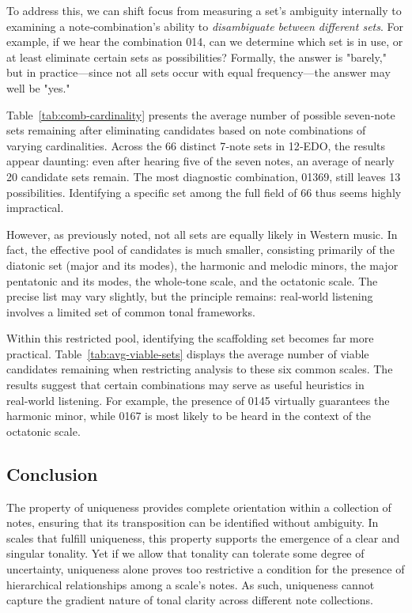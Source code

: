 \documentclass[10pt,twocolumn]{article}
\numberwithin{equation}{section} %
\begin{document}
    To address this, we can shift focus from measuring a set's ambiguity internally to examining a note‑combination's ability to \textit{disambiguate between different sets}.
    For example, if we hear the combination 014, can we determine which set is in use, or at least eliminate certain sets as possibilities?
    Formally, the answer is "barely," but in practice—since not all sets occur with equal frequency—the answer may well be "yes."

    Table~\ref{tab:comb-cardinality} presents the average number of possible seven‑note sets remaining after eliminating candidates based on note combinations of varying cardinalities.
    Across the 66 distinct 7‑note sets in 12‑EDO, the results appear daunting: even after hearing five of the seven notes, an average of nearly 20 candidate sets remain.
    The most diagnostic combination, 01369, still leaves 13 possibilities.
    Identifying a specific set among the full field of 66 thus seems highly impractical.

    

    However, as previously noted, not all sets are equally likely in Western music.
    In fact, the effective pool of candidates is much smaller, consisting primarily of the diatonic set (major and its modes), the harmonic and melodic minors, the major pentatonic and its modes, the whole‑tone scale, and the octatonic scale.
    The precise list may vary slightly, but the principle remains: real‑world listening involves a limited set of common tonal frameworks.

    Within this restricted pool, identifying the scaffolding set becomes far more practical.
    Table~\ref{tab:avg-viable-sets} displays the average number of viable candidates remaining when restricting analysis to these six common scales.
    The results suggest that certain combinations may serve as useful heuristics in real‑world listening.
    For example, the presence of 0145 virtually guarantees the harmonic minor, while 0167 is most likely to be heard in the context of the octatonic scale.

    

    \subsection{Conclusion}

    The property of uniqueness provides complete orientation within a collection of notes, ensuring that its transposition can be identified without ambiguity.
    In scales that fulfill uniqueness, this property supports the emergence of a clear and singular tonality.
    Yet if we allow that tonality can tolerate some degree of uncertainty, uniqueness alone proves too restrictive a condition for the presence of hierarchical relationships among a scale's notes.
    As such, uniqueness cannot capture the gradient nature of tonal clarity across different note collections.
\end{document}
